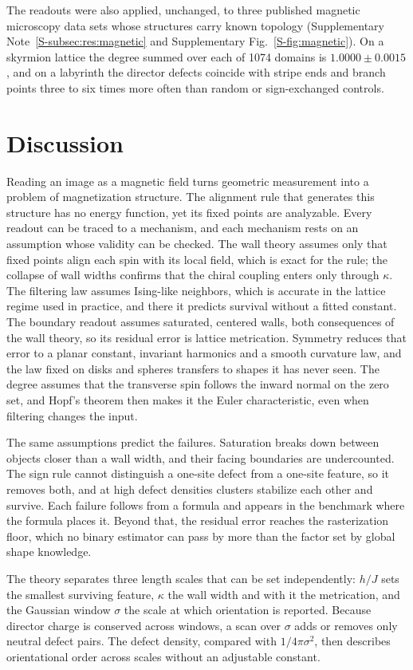 \documentclass[11pt,a4paper]{article}
\begin{document}
The readouts were also applied, unchanged, to three published magnetic microscopy data sets whose structures carry known topology (Supplementary Note~\ref{S-subsec:res:magnetic} and Supplementary Fig.~\ref{S-fig:magnetic}). On a skyrmion lattice the degree summed over each of 1074 domains is $1.0000\pm0.0015$, and on a labyrinth the director defects coincide with stripe ends and branch points three to six times more often than random or sign-exchanged controls.

\section*{Discussion}
Reading an image as a magnetic field turns geometric measurement into a problem of magnetization structure. The alignment rule that generates this structure has no energy function, yet its fixed points are analyzable. Every readout can be traced to a mechanism, and each mechanism rests on an assumption whose validity can be checked. The wall theory assumes only that fixed points align each spin with its local field, which is exact for the rule; the collapse of wall widths confirms that the chiral coupling enters only through $\kappa$. The filtering law assumes Ising-like neighbors, which is accurate in the lattice regime used in practice, and there it predicts survival without a fitted constant. The boundary readout assumes saturated, centered walls, both consequences of the wall theory, so its residual error is lattice metrication. Symmetry reduces that error to a planar constant, invariant harmonics and a smooth curvature law, and the law fixed on disks and spheres transfers to shapes it has never seen. The degree assumes that the transverse spin follows the inward normal on the zero set, and Hopf's theorem then makes it the Euler characteristic, even when filtering changes the input.

The same assumptions predict the failures. Saturation breaks down between objects closer than a wall width, and their facing boundaries are undercounted. The sign rule cannot distinguish a one-site defect from a one-site feature, so it removes both, and at high defect densities clusters stabilize each other and survive. Each failure follows from a formula and appears in the benchmark where the formula places it. Beyond that, the residual error reaches the rasterization floor, which no binary estimator can pass by more than the factor set by global shape knowledge.

The theory separates three length scales that can be set independently: $h/J$ sets the smallest surviving feature, $\kappa$ the wall width and with it the metrication, and the Gaussian window $\sigma$ the scale at which orientation is reported. Because director charge is conserved across windows, a scan over $\sigma$ adds or removes only neutral defect pairs. The defect density, compared with $1/4\pi\sigma^2$, then describes orientational order across scales without an adjustable constant. 
\end{document}

